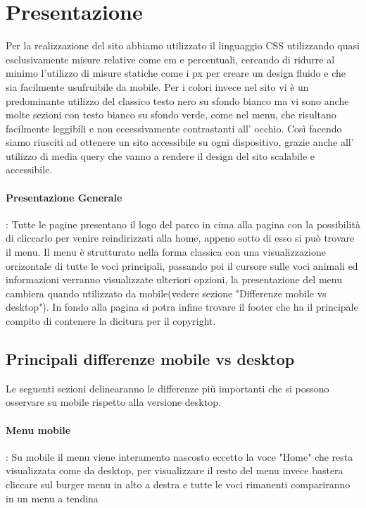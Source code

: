 \section{Presentazione}
    Per la realizzazione del sito abbiamo utilizzato il linguaggio CSS utilizzando quasi esclusivamente misure  relative come em e percentuali, cercando di ridurre al minimo l'utilizzo di misure statiche come i px per creare un design fluido e che sia facilmente usufruibile da mobile.
    Per i colori invece nel sito vi è un predominante utilizzo del classico testo nero su sfondo bianco ma vi sono anche molte sezioni con testo bianco su sfondo verde, come nel menu, che risultano facilmente leggibili e non eccessivamente contrastanti all' occhio.
    Così facendo siamo riusciti ad ottenere un sito accessibile su ogni dispositivo, grazie anche all' utilizzo di media query che vanno a rendere il design del sito scalabile e accessibile.
    
    \paragraph{Presentazione Generale}: Tutte le pagine presentano il logo del parco in cima alla pagina con la possibilità di cliccarlo per venire reindirizzati alla home, appeno sotto di esso si può trovare il menu. Il menu è strutturato nella forma classica con una visualizzazione orrizontale
                                        di tutte le voci principali, passando poi il cursore sulle voci animali ed informazioni verranno visualizzate ulteriori opzioni, la presentazione del menu cambiera quando utilizzato da mobile(vedere sezione "Differenze mobile vs desktop").
                                        In fondo alla pagina si potra infine trovare il footer che ha il principale compito di contenere la dicitura per il copyright.

    \subsection{Principali differenze mobile vs desktop}
        Le seguenti sezioni delinearanno le differenze più importanti che si possono osservare su mobile rispetto alla versione desktop.

        \paragraph{Menu mobile}: Su mobile il menu viene interamento nascosto eccetto la voce "Home" che resta visualizzata come da desktop, per visualizzare il resto del menu invece bastera cliccare sul burger menu in alto a destra e tutte le voci rimanenti compariranno
                                in un menu a tendina

